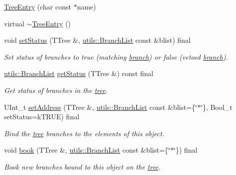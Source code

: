 \begin{DoxyCompactItemize}
\item 
\hyperlink{classpanda_1_1TreeEntry_a3e4d2b1708db6f13525a6eff2b577b88}{TreeEntry} (char const $\ast$name)
\item 
virtual \hyperlink{classpanda_1_1TreeEntry_a56aa861e9e5589723cbd45c701ca96c6}{$\sim$TreeEntry} ()
\item 
void \hyperlink{classpanda_1_1TreeEntry_a8d65c0ee41e1ef5c7f7a41c454dad052}{setStatus} (TTree \&, \hyperlink{classpanda_1_1utils_1_1BranchList}{utils::BranchList} const \&blist) final
\begin{DoxyCompactList}\small\item\em Set status of branches to true (matching \hyperlink{namespacepanda_1_1branch}{branch}) or false (vetoed \hyperlink{namespacepanda_1_1branch}{branch}). \item\end{DoxyCompactList}\item 
\hyperlink{classpanda_1_1utils_1_1BranchList}{utils::BranchList} \hyperlink{classpanda_1_1TreeEntry_a3be7000fca4d0dd356488643aaa752dd}{getStatus} (TTree \&) const final
\begin{DoxyCompactList}\small\item\em Get status of branches in the \hyperlink{namespacepanda_1_1tree}{tree}. \item\end{DoxyCompactList}\item 
UInt\_\-t \hyperlink{classpanda_1_1TreeEntry_a693015be3e9d7c6daffe056798150455}{setAddress} (TTree \&, \hyperlink{classpanda_1_1utils_1_1BranchList}{utils::BranchList} const \&blist=\{\char`\"{}$\ast$\char`\"{}\}, Bool\_\-t setStatus=kTRUE) final
\begin{DoxyCompactList}\small\item\em Bind the \hyperlink{namespacepanda_1_1tree}{tree} branches to the elements of this object. \item\end{DoxyCompactList}\item 
void \hyperlink{classpanda_1_1TreeEntry_a2ad0cb0f4cdaca3292274a6c94f5ae2f}{book} (TTree \&, \hyperlink{classpanda_1_1utils_1_1BranchList}{utils::BranchList} const \&blist=\{\char`\"{}$\ast$\char`\"{}\}) final
\begin{DoxyCompactList}\small\item\em Book new branches bound to this object on the \hyperlink{namespacepanda_1_1tree}{tree}. \item\end{DoxyCompactList}\item 

\end{DoxyCompactItemize}
